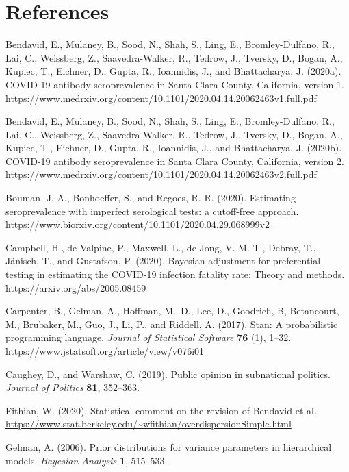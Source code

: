\documentclass[11pt]{article}
\begin{document}
\section*{References}

\noindent

\bibitem Bendavid, E., Mulaney, B., Sood, N., Shah, S., Ling, E.,
  Bromley-Dulfano, R., Lai, C., Weissberg, Z., Saavedra-Walker, R.,
  Tedrow, J., Tversky, D., Bogan, A., Kupiec, T., Eichner, D., Gupta,
  R., Ioannidis, J., and Bhattacharya, J. (2020a).  COVID-19 antibody
  seroprevalence in Santa Clara County, California, version 1. {\small
    \url{https://www.medrxiv.org/content/10.1101/2020.04.14.20062463v1.full.pdf}}

\bibitem Bendavid, E., Mulaney, B., Sood, N., Shah, S., Ling, E.,
  Bromley-Dulfano, R., Lai, C., Weissberg, Z., Saavedra-Walker, R.,
  Tedrow, J., Tversky, D., Bogan, A., Kupiec, T., Eichner, D., Gupta,
  R., Ioannidis, J., and Bhattacharya, J. (2020b).  COVID-19 antibody
  seroprevalence in Santa Clara County, California, version 2. {\small
    \url{https://www.medrxiv.org/content/10.1101/2020.04.14.20062463v2.full.pdf}}

\bibitem Bouman, J. A., Bonhoeffer, S., and Regoes, R. R.  (2020).
  Estimating seroprevalence with imperfect serological tests: a
  cutoff-free approach.  {\small
    \url{https://www.biorxiv.org/content/10.1101/2020.04.29.068999v2}}

\bibitem Campbell, H., de Valpine, P., Maxwell, L., de Jong, V. M. T.,
  Debray, T., Jänisch, T., and Gustafson, P. (2020).  Bayesian
  adjustment for preferential testing in estimating the COVID-19
  infection fatality rate: Theory and methods.  {\small
    \url{https://arxiv.org/abs/2005.08459}}

\bibitem Carpenter, B., Gelman, A., Hoffman, M.~D., Lee, D., Goodrich,
  B, Betancourt, M., Brubaker, M., Guo, J., Li, P., and Riddell, A.
  (2017). Stan: A probabilistic programming language. {\em Journal of
    Statistical Software} {\bf 76} (1), 1--32. {\small
    \url{https://www.jstatsoft.org/article/view/v076i01}}

\bibitem Caughey, D., and Warshaw, C. (2019).  Public opinion in
  subnational politics.  {\em Journal of Politics} {\bf 81}, 352--363.

\bibitem Fithian, W. (2020).  Statistical comment on the revision of
  Bendavid et al. {\small
    \url{https://www.stat.berkeley.edu/~wfithian/overdispersionSimple.html}}

\bibitem Gelman, A. (2006). Prior distributions for variance
  parameters in hierarchical models. {\em Bayesian Analysis} {\bf 1},
  515--533.
  
\end{document}
